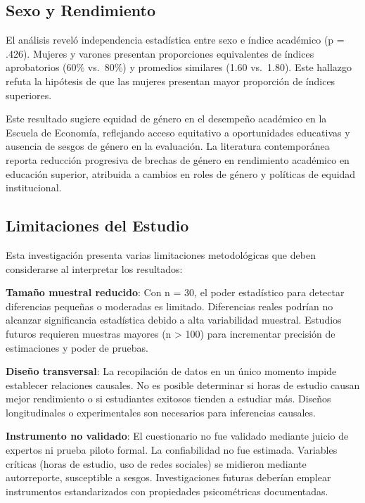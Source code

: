 \documentclass[
  stu,
  floatsintext,
  longtable,
  a4paper,
  nolmodern,
  notxfonts,
  notimes,
  12pt,
  colorlinks=true,linkcolor=blue,citecolor=blue,urlcolor=blue]{apa7}
\begin{document}
\subsection{Sexo y Rendimiento}\label{sexo-y-rendimiento}

El análisis reveló independencia estadística entre sexo e índice
académico (p = .426). Mujeres y varones presentan proporciones
equivalentes de índices aprobatorios (60\% vs.~80\%) y promedios
similares (1.60 vs.~1.80). Este hallazgo refuta la hipótesis de que las
mujeres presentan mayor proporción de índices superiores.

Este resultado sugiere equidad de género en el desempeño académico en la
Escuela de Economía, reflejando acceso equitativo a oportunidades
educativas y ausencia de sesgos de género en la evaluación. La
literatura contemporánea reporta reducción progresiva de brechas de
género en rendimiento académico en educación superior, atribuida a
cambios en roles de género y políticas de equidad institucional.

\subsection{Limitaciones del Estudio}\label{limitaciones-del-estudio}

Esta investigación presenta varias limitaciones metodológicas que deben
considerarse al interpretar los resultados:

\textbf{Tamaño muestral reducido}: Con n = 30, el poder estadístico para
detectar diferencias pequeñas o moderadas es limitado. Diferencias
reales podrían no alcanzar significancia estadística debido a alta
variabilidad muestral. Estudios futuros requieren muestras mayores (n
\textgreater{} 100) para incrementar precisión de estimaciones y poder
de pruebas.

\textbf{Diseño transversal}: La recopilación de datos en un único
momento impide establecer relaciones causales. No es posible determinar
si horas de estudio causan mejor rendimiento o si estudiantes exitosos
tienden a estudiar más. Diseños longitudinales o experimentales son
necesarios para inferencias causales.

\textbf{Instrumento no validado}: El cuestionario no fue validado
mediante juicio de expertos ni prueba piloto formal. La confiabilidad no
fue estimada. Variables críticas (horas de estudio, uso de redes
sociales) se midieron mediante autorreporte, susceptible a sesgos.
Investigaciones futuras deberían emplear instrumentos estandarizados con
propiedades psicométricas documentadas.
\end{document}
